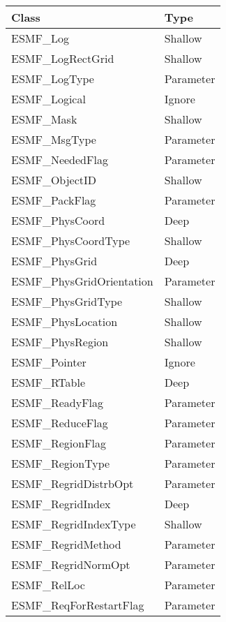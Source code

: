 \begin{table}[t]
\begin{tabular}{ll}

{\bf Class} & {\bf Type} \\ \hline

ESMF\_Log                   & Shallow\\
ESMF\_LogRectGrid           & Shallow\\
ESMF\_LogType               & Parameter \\
ESMF\_Logical               & Ignore\\
ESMF\_Mask                  & Shallow\\
ESMF\_MsgType               & Parameter \\
ESMF\_NeededFlag            & Parameter \\
ESMF\_ObjectID              & Shallow\\
ESMF\_PackFlag              & Parameter \\
ESMF\_PhysCoord             & Deep \\
ESMF\_PhysCoordType         & Shallow\\
ESMF\_PhysGrid              & Deep \\
ESMF\_PhysGridOrientation   & Parameter \\
ESMF\_PhysGridType          & Shallow\\
ESMF\_PhysLocation          & Shallow\\
ESMF\_PhysRegion            & Shallow\\
ESMF\_Pointer               & Ignore\\
ESMF\_RTable                & Deep \\
ESMF\_ReadyFlag             & Parameter \\
ESMF\_ReduceFlag            & Parameter \\
ESMF\_RegionFlag            & Parameter \\
ESMF\_RegionType            & Parameter \\
ESMF\_RegridDistrbOpt       & Parameter \\
ESMF\_RegridIndex           & Deep \\
ESMF\_RegridIndexType       & Shallow\\
ESMF\_RegridMethod          & Parameter \\
ESMF\_RegridNormOpt         & Parameter \\
ESMF\_RelLoc                & Parameter \\
ESMF\_ReqForRestartFlag     & Parameter \\

\end{tabular}
\end{table}
